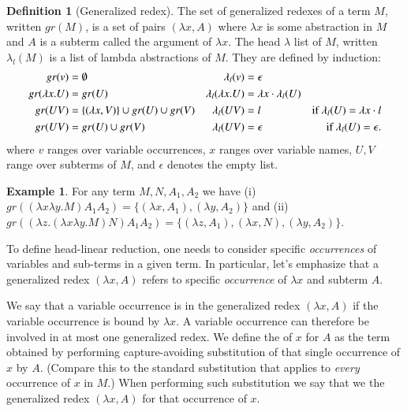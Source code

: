 \documentclass{elsarticle}
\theoremstyle{plain}
\theoremstyle{definition}
\newtheorem{definition}{Definition}[section]
\newtheorem{example}{Example}[section]
\theoremstyle{remark}
\begin{document}
\begin{definition}[Generalized redex]
\label{dfn:generalized_redex}
The set of generalized redexes of a term $M$, written $gr(M)$, is a set of pairs $(\lambda x, A)$ where $\lambda x$ is some abstraction in $M$ and $A$ is a subterm called the argument of $\lambda x$. The head $\lambda$ list of $M$, written $\lambda_l(M)$ is a list of lambda abstractions of $M$. They are defined by induction:
\begin{align*}
gr(v) &= \emptyset & \lambda_l(v) &= \epsilon\\
gr(\lambda x. U) &= gr(U) & \lambda_l(\lambda x. U) &= \lambda x \cdot \lambda_l(U) \\
gr(U V) &= \{ (\lambda x, V) \} \cup gr(U) \cup gr(V) &
\lambda_l(U V) &= l & \mbox{if $\lambda_l(U) = \lambda x \cdot l$} \\
gr(U V) &= gr(U) \cup gr(V) & \lambda_l(U V) &= \epsilon & \mbox{if $\lambda_l(U) = \epsilon$.}
\end{align*}
where $v$ ranges over variable occurrences, $x$ ranges over variable names, $U, V$ range over subterms of $M$, and $\epsilon$ denotes the empty list.
\end{definition}

\begin{example} For any term $M, N, A_1, A_2$ we have
(i) $gr((\lambda x \lambda y . M) A_1 A_2) = \{ (\lambda x, A_1), (\lambda y, A_2)\}$ and
(ii) $gr((\lambda z . (\lambda x \lambda y . M) N) A_1 A_2) = \{ (\lambda z, A_1), (\lambda x, N), (\lambda y, A_2)\}$.
\end{example}

To define head-linear reduction, one needs to consider specific \emph{occurrences} of variables and sub-terms in a given term. In particular, let's emphasize that a generalized redex  $(\lambda x, A)$ refers to specific \emph{occurrence} of $\lambda x$ and subterm $A$.

We say that a variable occurrence is  in the generalized redex $(\lambda x, A)$ if the variable occurrence is bound by $\lambda x$. A variable occurrence can therefore be involved in at most one generalized redex. We define the  of $x$ for $A$ as the term obtained by performing capture-avoiding substitution of that single occurrence of $x$ by $A$. (Compare this to the standard substitution that applies to \emph{every} occurrence of $x$ in $M$.) When performing such substitution we say that we  the generalized redex $(\lambda x, A)$ for that occurrence of $x$.
\end{document}
